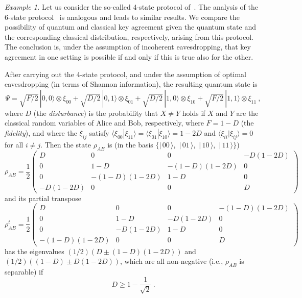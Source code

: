 \documentclass{article}
\def\D{{D}}
\def\ket#1{|\,#1\,\rangle}
\newcommand{\noi}{\noindent}
\begin{document}
\noi
{\it Example 1.}
Let us consider the  so-called 4-state  protocol
of~\cite{BB84}.
The analysis of the  6-state protocol~\cite{bg} is analogous and leads to similar
results. 
We compare  the possibility of 
quantum and classical key agreement given the 
quantum state and the corresponding classical distribution, respectively, arising 
from this protocol. The conclusion 
is, under the assumption of incoherent eavesdropping, that key 
agreement in one setting is possible if and only if this is true 
also for the other. 

After carrying out the 4-state protocol, and under the assumption of 
optimal  eavesdropping (in terms of Shannon information), the resulting 
quantum state is~\cite{FGGNP}
{\small
\[
\Psi=\sqrt{F/2}\, |0,0\rangle\otimes \xi_{00}+\sqrt{D/2}\, |0,1\rangle\otimes  \xi_{01}+\sqrt{D/2}\, |1,0\rangle\otimes  \xi_{10}+
\sqrt{F/2}\, |1,1\rangle\otimes  \xi_{11}\ ,
\]
}where $D$ (the {\em disturbance\/}) is the probability that $X\ne Y$ holds if
 $X$ and $Y$ are the classical random variables of Alice and Bob, respectively,
where $F=1-D$ (the {\em fidelity\/}),
and where the $\xi_{ij}$ satisfy $\langle \xi_{00}|\xi_{11}\rangle=
\langle \xi_{01}|\xi_{10}\rangle=1-2D$ and $\langle \xi_{ii}|\xi_{ij}\rangle=0$
for all $i\ne j$. Then the state $\rho_{AB}$ is (in the  basis
$\{\ket{00}$,\, $\ket{01}$,\, $\ket{10}$,\, $\ket{11}\}$)
{\small
\[
\rho_{AB}=\frac{1}{2}\left(
\begin{array}{cccc}
\D & 0 & 0 & -\D(1-2D) \\
0 & 1-D & -(1-D)(1-2D) & 0\\
0 & -(1-D)(1-2D) & 1-D & 0\\
-\D(1-2D) & 0 & 0 & \D
\end{array}
\right)
\]
}and its partial transpose
{\small
\[
\rho_{AB}^t=
\frac{1}{2}\left(
\begin{array}{cccc}
\D & 0 & 0 & -(1-D)(1-2D) \\
0 & 1-D & -\D(1-2D) & 0 \\
0 & -\D(1-2D) & 1-D & 0 \\
-(1-D)(1-2D)  & 0 & 0 & \D
\end{array}
\right)
\]
}has the eigenvalues $(1/2)(D\pm(1-D)(1-2D))$ and $(1/2)((1-D)\pm D(1-2D))$, which are 
all non-negative (i.e., $\rho_{AB}$ is separable) if
\begin{equation}\label{coeins}
D\geq 1-\frac{1}{\sqrt{2}}\ .
\end{equation}
\end{document}

